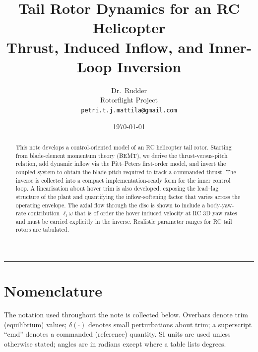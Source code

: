 \documentclass[11pt,a4paper]{article}
\title{\textbf{Tail Rotor Dynamics for an RC Helicopter}\\[6pt]
\large Thrust, Induced Inflow, and Inner-Loop Inversion}
\author{Dr.~Rudder \\ \small Rotorflight Project \\ \small \texttt{petri.t.j.mattila@gmail.com}}
\date{\today}
\let\oldsection\section
\renewcommand{\section}{\clearpage\oldsection}
\begin{document}
\maketitle

\begin{abstract}
\noindent This note develops a control-oriented model of an RC helicopter tail rotor.
Starting from blade-element momentum theory (BEMT), we derive the thrust-versus-pitch
relation, add dynamic inflow via the Pitt--Peters first-order model, and invert the
coupled system to obtain the blade pitch required to track a commanded thrust. The
inverse is collected into a compact implementation-ready form for the inner control
loop. A linearisation about hover trim is also developed, exposing the lead--lag
structure of the plant and quantifying the inflow-softening factor that varies
across the operating envelope. The axial flow through the disc is shown to include
a body-yaw-rate contribution \(\ell_t\omega\) that is of order the hover induced
velocity at RC 3D yaw rates and must be carried explicitly in the inverse.
Realistic parameter ranges for RC tail rotors are tabulated.
\end{abstract}

\tableofcontents
\vspace{1em}
\hrule
\vspace{1em}

\section*{Nomenclature}

\noindent The notation used throughout the note is collected below. Overbars
denote trim (equilibrium) values; \(\delta(\cdot)\) denotes small perturbations
about trim; a superscript ``cmd'' denotes a commanded (reference) quantity.
SI units are used unless otherwise stated; angles are in radians except where a
table lists degrees.
\end{document}
